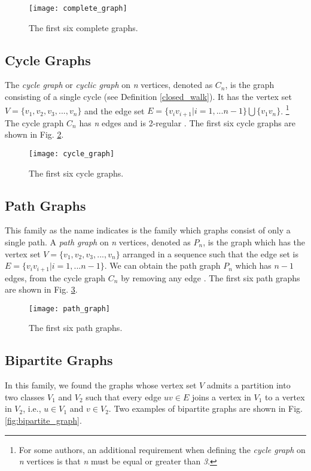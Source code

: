 \begin{figure}
	\centering
		\texttt{[image: complete\_graph]}
	\caption{The first six complete graphs.}
	\label{fig:complete_graph}
\end{figure}

\subsection{Cycle Graphs}
The \textit{cycle graph} or \textit{cyclic graph} on \textit{n} vertices, denoted as $C_{n}$, is the graph consisting of a single cycle (see Definition \ref{closed_walk}). It has the vertex set $V= \{ v_{1},v_{2},v_{3},...,v_{n} \}$ and the edge set $E= \{ v_{i}v_{i+1} | i=1,...n-1 \} \bigcup \{v_{1} v_{n} \}$. \footnote{For some authors, an additional requirement when defining the \textit{cycle graph} on \textit{n} vertices is that \textit{n} must be equal or greater than \textit{3}.}
The cycle graph $C_{n}$ has \textit{n} edges and is 2-regular \cite{wilsonwatkins}. The first six cycle graphs are shown in Fig. \ref{fig:cycle_graph}.

\begin{figure}
	\centering
		\texttt{[image: cycle\_graph]}
	\caption{The first six cycle graphs.}
	\label{fig:cycle_graph}
\end{figure}

\subsection{Path Graphs}
This family as the name indicates is the family which graphs consist of only a single path. A \textit{path graph}  on \textit{n} vertices, denoted as $P_{n}$, is the graph which has the vertex set $V= \{ v_{1},v_{2},v_{3},...,v_{n} \}$ arranged in a sequence  such that the edge set is  $E= \{ v_{i}v_{i+1} | i=1,...n-1 \} $. We can obtain the path graph $P_{n}$ which has $n-1$ edges, from the cycle graph $C_{n}$ by removing any edge \cite{wilsonwatkins}. The first six path graphs are shown in Fig. \ref{fig:path_graph}.

\begin{figure}
	\centering
		\texttt{[image: path\_graph]}
	\caption{The first six path graphs.}
	\label{fig:path_graph}
\end{figure}

\subsection{Bipartite Graphs}
In this family, we found the graphs whose vertex set $V$ admits a partition into two classes $V_{1}$ and $V_{2}$ such that every edge $uv \in E$ joins a vertex in $V_{1}$ to a vertex in $V_{2}$, i.e., $u \in V_{1}$ and $v \in V_{2}$. Two examples of bipartite graphs are shown in Fig. \ref{fig:bipartite_graph}.

